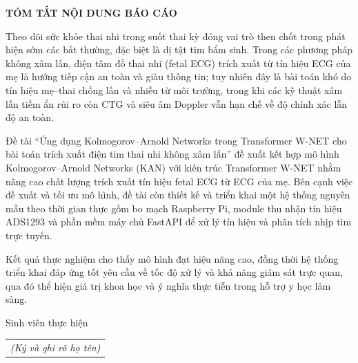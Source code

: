 \documentclass[../DoAn.tex]{subfiles}
\begin{document}
\begin{center}
    \Large{\textbf{TÓM TẮT NỘI DUNG BÁO CÁO}}\\
\end{center}
Theo dõi sức khỏe thai nhi trong suốt thai kỳ đóng vai trò then chốt trong phát hiện sớm các bất thường, đặc biệt là dị tật tim bẩm sinh. Trong các phương pháp không xâm lấn, điện tâm đồ thai nhi (fetal ECG) trích xuất từ tín hiệu ECG của mẹ là hướng tiếp cận an toàn và giàu thông tin; tuy nhiên đây là bài toán khó do tín hiệu mẹ--thai chồng lấn và nhiễu từ môi trường, trong khi các kỹ thuật xâm lấn tiềm ẩn rủi ro còn CTG và siêu âm Doppler vẫn hạn chế về độ chính xác lẫn độ an toàn.

Đề tài ``Ứng dụng Kolmogorov–Arnold Networks trong Transformer W-NET cho bài toán trích xuất điện tim thai nhi không xâm lấn'' đề xuất kết hợp mô hình Kolmogorov--Arnold Networks (KAN) với kiến trúc Transformer W-NET nhằm nâng cao chất lượng trích xuất tín hiệu fetal ECG từ ECG của mẹ. Bên cạnh việc đề xuất và tối ưu mô hình, đề tài còn thiết kế và triển khai một hệ thống nguyên mẫu theo thời gian thực gồm bo mạch Raspberry Pi, module thu nhận tín hiệu ADS1293 và phần mềm máy chủ FastAPI để xử lý tín hiệu và phân tích nhịp tim trực tuyến.

Kết quả thực nghiệm cho thấy mô hình đạt hiệu năng cao, đồng thời hệ thống triển khai đáp ứng tốt yêu cầu về tốc độ xử lý và khả năng giám sát trực quan, qua đó thể hiện giá trị khoa học và ý nghĩa thực tiễn trong hỗ trợ y học lâm sàng.

\begin{flushright}
Sinh viên thực hiện\\
\begin{tabular}{@{}c@{}}
\textit{(Ký và ghi rõ họ tên)}
\end{tabular}
\end{flushright}
\end{document}
